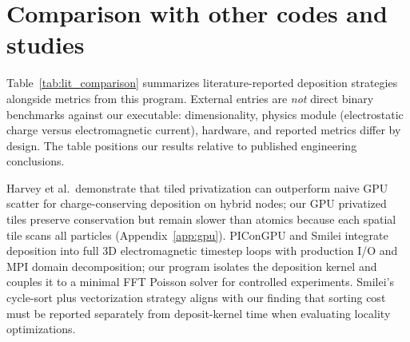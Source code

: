 \section{Comparison with other codes and studies}
\label{sec:code_comparison}

Table~\ref{tab:lit_comparison} summarizes literature-reported deposition strategies alongside metrics from this program.
External entries are \emph{not} direct binary benchmarks against our executable: dimensionality, physics module (electrostatic charge versus electromagnetic current), hardware, and reported metrics differ by design.
The table positions our results relative to published engineering conclusions.

\begin{table}[t]
\centering
\small
\caption{Literature comparison of deposition engineering (metrics are not directly commensurate).}
\label{tab:lit_comparison}
\end{table}

Harvey et al.\ demonstrate that tiled privatization can outperform naive GPU scatter for charge-conserving deposition on hybrid nodes; our GPU privatized tiles preserve conservation but remain slower than atomics because each spatial tile scans all particles (Appendix~\ref{app:gpu}).
PIConGPU and Smilei integrate deposition into full 3D electromagnetic timestep loops with production I/O and MPI domain decomposition; our program isolates the deposition kernel and couples it to a minimal FFT Poisson solver for controlled experiments.
Smilei's cycle-sort plus vectorization strategy aligns with our finding that sorting cost must be reported separately from deposit-kernel time when evaluating locality optimizations.
